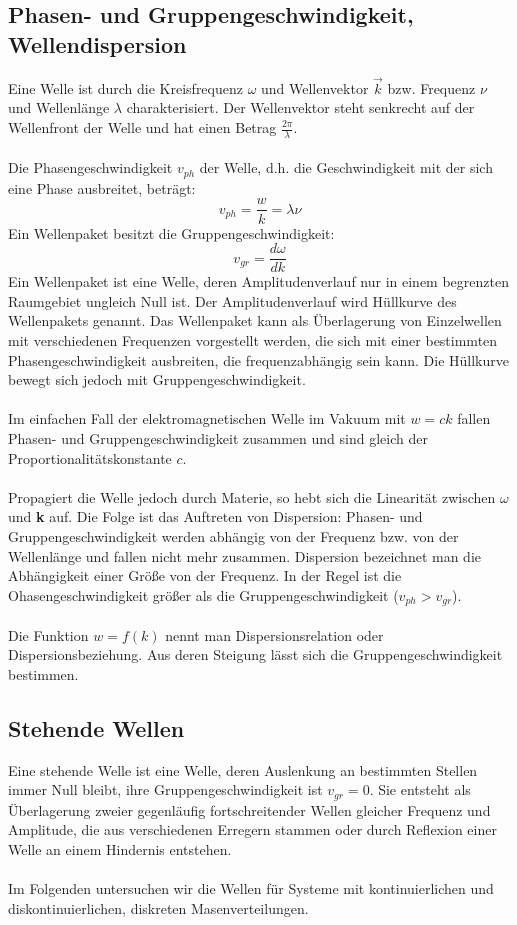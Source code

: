 \documentclass[a4paper,titlepage]{scrartcl}
\numberwithin{equation}{section}
\begin{document}
\subsection{Phasen- und Gruppengeschwindigkeit, Wellendispersion}
Eine Welle ist durch die Kreisfrequenz $\omega$ und Wellenvektor $\vec{k}$ bzw. Frequenz $\nu$ und Wellenlänge $\lambda$ charakterisiert. Der Wellenvektor steht senkrecht auf der Wellenfront der Welle und hat einen Betrag $\frac{2 \pi}{\lambda}$.\\ \\
Die Phasengeschwindigkeit $v_{ph}$ der Welle, d.h. die Geschwindigkeit mit der sich eine Phase ausbreitet, beträgt:
\begin{equation*}
v_{ph}=\frac{w}{k}=\lambda \nu
\end{equation*}
Ein Wellenpaket besitzt die Gruppengeschwindigkeit:
\begin{equation*}
v_{gr}=\frac{d \omega}{d k}
\end{equation*}
Ein Wellenpaket ist eine Welle, deren Amplitudenverlauf nur in einem begrenzten Raumgebiet ungleich Null ist. Der Amplitudenverlauf wird Hüllkurve des Wellenpakets genannt. Das Wellenpaket kann als Überlagerung von Einzelwellen mit verschiedenen Frequenzen vorgestellt werden, die sich mit einer bestimmten Phasengeschwindigkeit ausbreiten, die frequenzabhängig sein kann. Die Hüllkurve bewegt sich jedoch mit Gruppengeschwindigkeit. \cite{wiki:gruppengeschwindigkeit}\\ \\
Im einfachen Fall der elektromagnetischen Welle im Vakuum mit $w=ck$ fallen Phasen- und Gruppengeschwindigkeit zusammen und sind gleich der Proportionalitätskonstante $c$.\\ \\
Propagiert die Welle jedoch durch Materie, so hebt sich die Linearität zwischen $\omega$ und \textbf{k} auf. Die Folge ist das Auftreten von Dispersion: Phasen- und Gruppengeschwindigkeit werden abhängig von der Frequenz bzw. von der Wellenlänge und fallen nicht mehr zusammen. Dispersion bezeichnet man die Abhängigkeit einer Größe von der Frequenz. In der Regel ist die Ohasengeschwindigkeit größer als die Gruppengeschwindigkeit ($v_{ph}>v_{gr}$).\\ \\
Die Funktion $w=f(k)$ nennt man Dispersionsrelation oder Dispersionsbeziehung. Aus deren Steigung lässt sich die Gruppengeschwindigkeit bestimmen.
\subsection{Stehende Wellen}
Eine stehende Welle ist eine Welle, deren Auslenkung an bestimmten Stellen immer Null bleibt, ihre Gruppengeschwindigkeit ist $v_{gr}=0$. Sie entsteht als Überlagerung zweier gegenläufig fortschreitender Wellen gleicher Frequenz und Amplitude, die aus verschiedenen Erregern stammen oder durch Reflexion einer Welle an einem Hindernis entstehen. \cite{wiki:stehendewelle}\\ \\
Im Folgenden untersuchen wir die Wellen für Systeme mit kontinuierlichen und diskontinuierlichen, diskreten Masenverteilungen.
\end{document}
